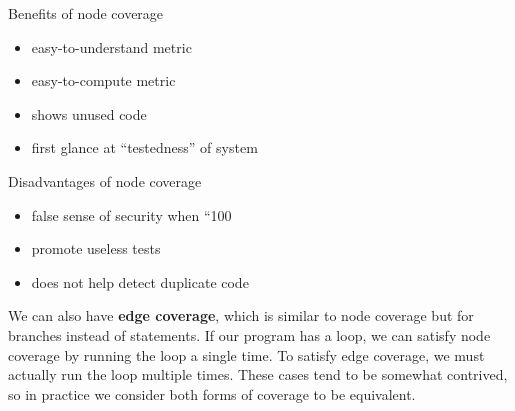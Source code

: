 \documentclass[12pt]{article}
\begin{document}
Benefits of node coverage
\begin{itemize}
\item easy-to-understand metric
\item easy-to-compute metric
\item shows unused code
\item first glance at ``testedness'' of system
\end{itemize}

Disadvantages of node coverage
\begin{itemize}
\item false sense of security when ``100%
\item promote useless tests
\item does not help detect duplicate code
\end{itemize}

We can also have {\bf edge coverage}, which is similar to node coverage but for branches instead of statements. If our program has a loop, we can satisfy node coverage by running the loop a single time. To satisfy edge coverage, we must actually run the loop multiple times. These cases tend to be somewhat contrived, so in practice we consider both forms of coverage to be equivalent.
\end{document}
